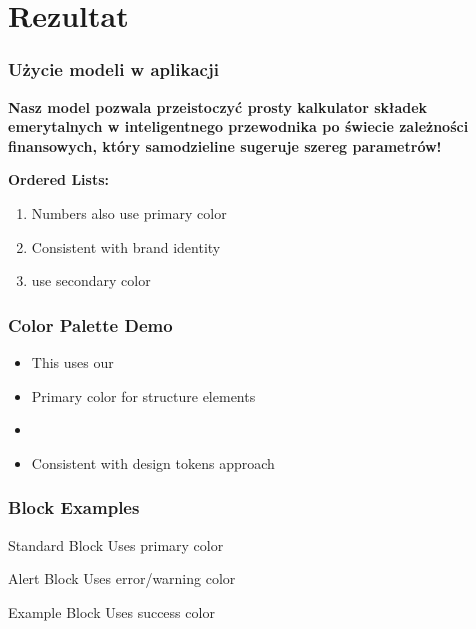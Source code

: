 \documentclass{beamer}
\begin{document}
\section{Rezultat}

\begin{frame}
    \frametitle{Użycie modeli w aplikacji}
    \textbf{Nasz model pozwala przeistoczyć prosty kalkulator składek emerytalnych
    w inteligentnego przewodnika po świecie zależności finansowych, który samodzieline sugeruje
    szereg parametrów!}
    \\
    \pause
\end{frame}

\begin{frame}
\textbf{Ordered Lists:}
\begin{enumerate}
    \item Numbers also use primary color
    \item Consistent with brand identity
    \item {} use secondary color
\end{enumerate}

\end{frame}

\begin{frame}
\frametitle{Color Palette Demo}
\begin{itemize}
    \item This uses our 
    \item Primary color for structure elements
    \item {}
    \item Consistent with design tokens approach
\end{itemize}
\end{frame}

\begin{frame}
\frametitle{Block Examples}

\begin{block}{Standard Block}
Uses primary color
\end{block}

\begin{alertblock}{Alert Block}
Uses error/warning color
\end{alertblock}

\begin{exampleblock}{Example Block}
Uses success color
\end{exampleblock}

\end{frame}
\end{document}
